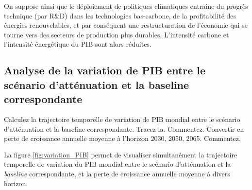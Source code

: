 \documentclass[a4,11pt]{aleph-notas}
\newcommand{\ans}[1]{
\begin{mdframed}[
    roundcorner=10pt,     %
    backgroundcolor=gray!20, %
    linecolor=black,      %
    linewidth=1pt,        %
    innertopmargin=10pt,  %
    innerbottommargin=10pt, %
    innerleftmargin=10pt,  %
    innerrightmargin=10pt  %
]
#1
\end{mdframed}
}
\begin{document}
On suppose ainsi que le déploiement de politiques climatiques entraîne du progrès technique (par R\&D) dans les technologies bas-carbone, de la profitabilité des énergies renouvelables, et par conséquent une restructuration de l'économie qui se tourne vers des secteurs de production plus durables. L’intensité carbone et l’intensité énergétique du PIB sont alors réduites.


\subsection{Analyse de la variation de PIB entre le scénario d’atténuation et la baseline correspondante}

\ans{Calculez la trajectoire temporelle de variation de PIB mondial entre le scénario d’atténuation et la baseline correspondante. Tracez-la. Commentez. Convertir en perte de croissance annuelle moyenne à l’horizon 2030, 2050, 2065. Commentez.}

La figure \ref{fig:variation_PIB} permet de visualiser simultanément la trajectoire temporelle de variation du PIB mondial entre le scénario d'atténuation et la \textit{baseline} correspondante, et la perte de croissance annuelle moyenne à divers horizon. 
\end{document}
